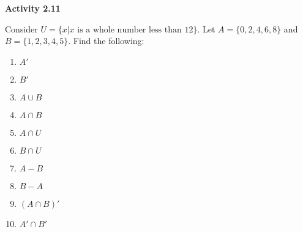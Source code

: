 \vspace{0.3ex}
\noindent\textbf{Activity 2.11}

\vspace{0.2ex}

Consider \(U = \{x | x \text{ is a whole number less than } 12\}\). Let \(A = \{0, 2, 4, 6, 8\}\) and \(B = \{1, 2, 3, 4, 5\}\). Find the following:
\begin{multicols}{2}
\begin{enumerate}[noitemsep, label = \color{blue}\arabic*. ]
\item \(A'\)
\item \(B'\)
\item \(A \cup B\)
\item \(A \cap B\)
\item \(A \cap U\)
\item \(B \cap U\)
\item \(A - B\)
\item \(B - A\)
\item \((A \cap B)'\)
\item \(A' \cap B'\)
\end{enumerate}
\end{multicols}

